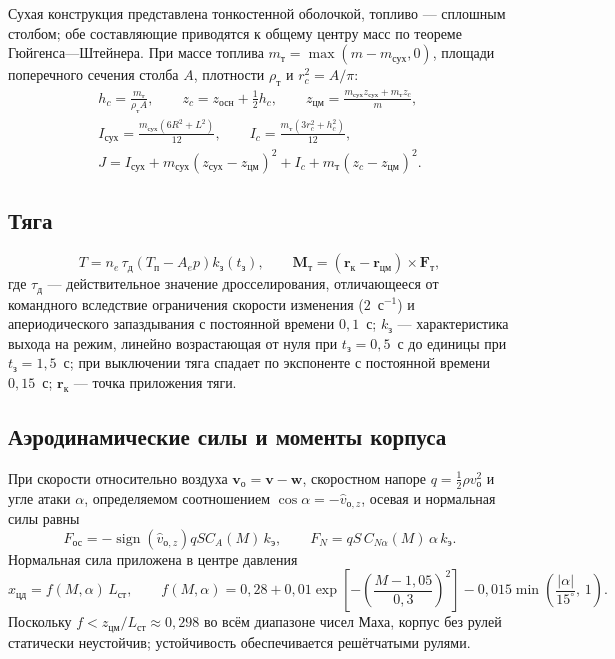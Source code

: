 \documentclass[11pt,a4paper]{article}
\newcommand{\vect}[1]{\bm{#1}}
\begin{document}
Сухая конструкция представлена тонкостенной оболочкой, топливо — сплошным
столбом; обе составляющие приводятся к общему центру масс по теореме
Гюйгенса—Штейнера. При массе топлива $m_{\text{т}}=\max(m-m_{\text{сух}},0)$,
площади поперечного сечения столба $A$, плотности $\rho_{\text{т}}$ и
$r_c^2=A/\pi$:
\begin{gather}
h_c = \frac{m_{\text{т}}}{\rho_{\text{т}} A},\qquad
z_c = z_{\text{осн}} + \tfrac{1}{2}h_c,\qquad
z_{\text{цм}} = \frac{m_{\text{сух}}z_{\text{сух}}
 + m_{\text{т}} z_c}{m},\\[4pt]
I_{\text{сух}} = \frac{m_{\text{сух}}\left(6R^2+L^2\right)}{12},
\qquad
I_{c} = \frac{m_{\text{т}}\left(3r_c^2+h_c^2\right)}{12},\\[4pt]
J = I_{\text{сух}}
 + m_{\text{сух}}\left(z_{\text{сух}}-z_{\text{цм}}\right)^2
 + I_{c} + m_{\text{т}}\left(z_c-z_{\text{цм}}\right)^2 .
\label{eq:inertia}
\end{gather}

\subsection{Тяга}

\begin{equation}
T = n_e\,\tau_{\text{д}}\left(T_{\text{п}}-A_e p\right)
 k_{\text{з}}(t_{\text{з}}),
\qquad
\vect{M}_{\text{т}} = \left(\vect{r}_{\text{к}}-\vect{r}_{\text{цм}}\right)
 \times\vect{F}_{\text{т}},
\end{equation}
где $\tau_{\text{д}}$ — действительное значение дросселирования, отличающееся от
командного вследствие ограничения скорости изменения ($2$~с$^{-1}$) и
апериодического запаздывания с постоянной времени $0{,}1$~с; $k_{\text{з}}$ —
характеристика выхода на режим, линейно возрастающая от нуля при
$t_{\text{з}}=0{,}5$~с до единицы при $t_{\text{з}}=1{,}5$~с; при выключении тяга
спадает по экспоненте с постоянной времени $0{,}15$~с; $\vect{r}_{\text{к}}$ —
точка приложения тяги.

\subsection{Аэродинамические силы и моменты корпуса}

При скорости относительно воздуха $\vect{v}_{\text{о}}=\vect{v}-\vect{w}$,
скоростном напоре $q=\tfrac12\rho v_{\text{о}}^2$ и угле атаки $\alpha$,
определяемом соотношением $\cos\alpha=-\hat v_{\text{о},z}$, осевая и нормальная
силы равны
\begin{equation}
F_{\text{ос}} = -\operatorname{sign}\left(\hat v_{\text{о},z}\right)
 q S C_A(M)\,k_{\text{э}},
\qquad
F_N = q S\, C_{N\alpha}(M)\,\alpha\, k_{\text{э}} .
\end{equation}
Нормальная сила приложена в центре давления
\begin{equation}
x_{\text{цд}} = f(M,\alpha)\,L_{\text{ст}},
\qquad
f(M,\alpha) = 0{,}28
 + 0{,}01\exp\!\left[-\left(\frac{M-1{,}05}{0{,}3}\right)^2\right]
 - 0{,}015\min\!\left(\frac{\lvert\alpha\rvert}{15^\circ},\,1\right).
\end{equation}
Поскольку $f<z_{\text{цм}}/L_{\text{ст}}\approx0{,}298$ во всём диапазоне чисел
Маха, корпус без рулей статически неустойчив; устойчивость обеспечивается
решётчатыми рулями.
\end{document}
